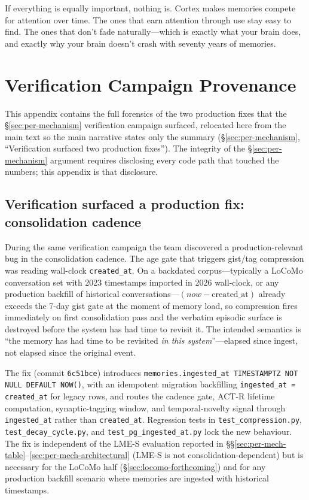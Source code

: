 \documentclass[11pt]{article}
\begin{document}
If everything is equally important, nothing is.  Cortex makes
memories compete for attention over time.  The ones that earn
attention through use stay easy to find.  The ones that don't fade
naturally---which is exactly what your brain does, and exactly why
your brain doesn't crash with seventy years of memories.

\section{Verification Campaign Provenance}
\label{app:provenance}

This appendix contains the full forensics of the two production
fixes that the \S\ref{sec:per-mechanism} verification campaign
surfaced, relocated here from the main text so the main narrative
states only the summary (\S\ref{sec:per-mechanism}, ``Verification
surfaced two production fixes'').  The integrity of the
\S\ref{sec:per-mechanism} argument requires disclosing every code
path that touched the numbers; this appendix is that disclosure.

\subsection{Verification surfaced a production fix: consolidation cadence}
\label{sec:cadence-fix}

During the same verification campaign the team discovered a
production-relevant bug in the consolidation cadence.  The age gate
that triggers gist/tag compression was reading wall-clock
\texttt{created\_at}.  On a backdated corpus---typically a LoCoMo
conversation set with 2023 timestamps imported in 2026 wall-clock,
or any production backfill of historical conversations---$(now -
\text{created\_at})$ already exceeds the 7-day gist gate at the
moment of memory load, so compression fires immediately on first
consolidation pass and the verbatim episodic surface is destroyed
before the system has had time to revisit it.  The intended
semantics is ``the memory has had time to be revisited \emph{in this
system}''---elapsed since ingest, not elapsed since the original
event.

The fix (commit \texttt{6c51bce}) introduces
\texttt{memories.ingested\_at TIMESTAMPTZ NOT NULL DEFAULT NOW()},
with an idempotent migration backfilling
\texttt{ingested\_at = created\_at} for legacy rows, and routes the
cadence gate, ACT-R lifetime computation, synaptic-tagging window,
and temporal-novelty signal through \texttt{ingested\_at} rather
than \texttt{created\_at}.  Regression tests in
\texttt{test\_compression.py}, \texttt{test\_decay\_cycle.py}, and
\texttt{test\_pg\_ingested\_at.py} lock the new behaviour.  The fix
is independent of the LME-S evaluation reported in
\S\S\ref{sec:per-mech-table}--\ref{sec:per-mech-architectural}
(LME-S is not consolidation-dependent) but is necessary for the
LoCoMo half (\S\ref{sec:locomo-forthcoming}) and for any production
backfill scenario where memories are ingested with historical
timestamps.
\end{document}
